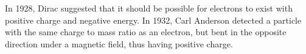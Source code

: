 In 1928, Dirac suggested that it should be possible for electrons to exist with positive charge and negative energy. In 1932, Carl Anderson detected a particle with the same charge to mass ratio as an electron, but bent in the opposite direction under a magnetic field, thus having positive charge. 